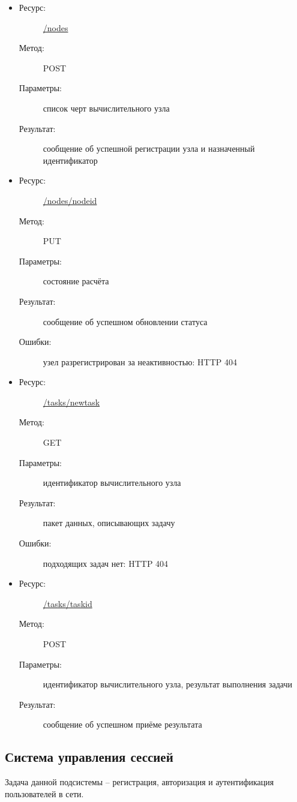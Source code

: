 \documentclass[a4paper,12pt]{report}
\numberwithin{equation}{section}
\begin{document}
\begin{itemize}
  \item
  \begin{description}
    \item[Ресурс:] \url{/nodes}
    \item[Метод:] POST
    \item[Параметры:] список черт вычислительного узла
    \item[Результат:] сообщение об успешной регистрации узла и назначенный идентификатор
  \end{description}
  \item
  \begin{description}
    \item[Ресурс:] \url{/nodes/nodeid}
    \item[Метод:] PUT
    \item[Параметры:] состояние расчёта
    \item[Результат:] сообщение об успешном обновлении статуса
    \item[Ошибки:] узел разрегистрирован за неактивностью: HTTP 404
  \end{description}
  \item
  \begin{description}
    \item[Ресурс:] \url{/tasks/newtask}
    \item[Метод:] GET
    \item[Параметры:] идентификатор вычислительного узла
    \item[Результат:] пакет данных, описывающих задачу
    \item[Ошибки:] подходящих задач нет: HTTP 404
  \end{description}
  \item
  \begin{description}
    \item[Ресурс:] \url{/tasks/taskid}
    \item[Метод:] POST
    \item[Параметры:] идентификатор вычислительного узла, результат выполнения задачи
    \item[Результат:] сообщение об успешном приёме результата
  \end{description}
\end{itemize}
  
\subsection{Система управления сессией}
Задача данной подсистемы -- регистрация, авторизация и аутентификация пользователей в сети.
\end{document}
